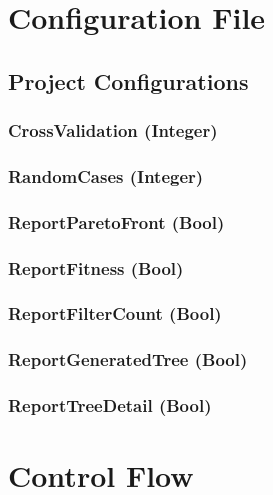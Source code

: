 \documentclass[]{article}
\begin{document}
\section{Configuration File}\label{configuration-file}

\subsection{Project Configurations}\label{project-configurations}

\subsubsection{CrossValidation (Integer)}\label{crossvalidation-integer}

\subsubsection{RandomCases (Integer)}\label{randomcases-integer}

\subsubsection{ReportParetoFront (Bool)}\label{reportparetofront-bool}

\subsubsection{ReportFitness (Bool)}\label{reportfitness-bool}

\subsubsection{ReportFilterCount (Bool)}\label{reportfiltercount-bool}

\subsubsection{ReportGeneratedTree
(Bool)}\label{reportgeneratedtree-bool}

\subsubsection{ReportTreeDetail (Bool)}\label{reporttreedetail-bool}

\section{Control Flow}\label{control-flow}
\end{document}
